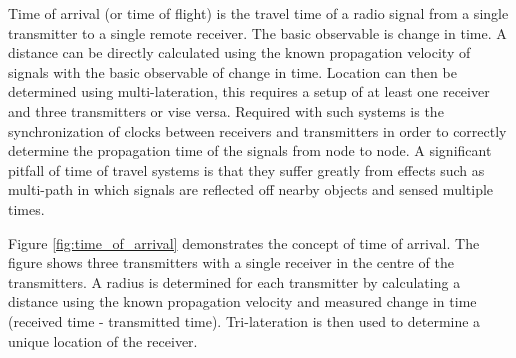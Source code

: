 \documentclass[11pt,a4paper]{report}
\begin{document}
			Time of arrival (or time of flight) is the travel time of a radio signal from a single transmitter to a single remote receiver. The basic observable is change in time. A distance can be directly calculated using the known propagation velocity of signals with the basic observable of change in time. Location can then be determined using multi-lateration, this requires a setup of at least one receiver and three transmitters or vise versa.
			Required with such systems is the synchronization of clocks between receivers and transmitters in order to correctly determine the propagation time of the signals from node to node.
			A significant pitfall of time of travel systems is that they suffer greatly from effects such as multi-path in which signals are reflected off nearby objects and sensed multiple times.
			\parencite{k._pahlavan_wideband_1998}
			
			Figure \ref{fig:time_of_arrival} demonstrates the concept of time of arrival. The figure shows three transmitters with a single receiver in the centre of the transmitters. A radius is determined for each transmitter by calculating a distance using the known propagation velocity and measured change in time (received time - transmitted time). Tri-lateration is then used to determine a unique location of the receiver.
		
\end{document}

